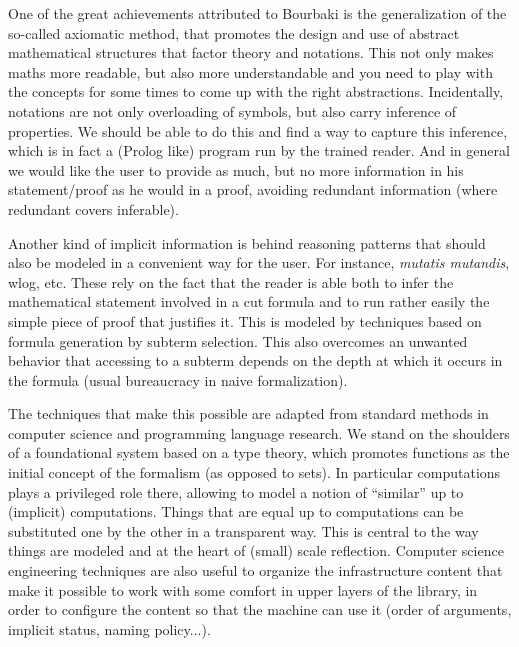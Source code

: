 One of the great achievements attributed to Bourbaki is the
generalization of the so-called axiomatic method, that promotes the
design and use of abstract mathematical structures that factor theory
and notations. This not only makes maths more readable, but also more
understandable and you need to play with the concepts for some times
to come up with the right abstractions. Incidentally, notations are
not only overloading of symbols, but also carry inference of
properties. We should be able to do this and find a way to capture this
inference, which is in fact a (Prolog like) program run by the trained
reader. And in general we would like the user to provide as much, but
no more information in his statement/proof as he would in a proof,
avoiding redundant information (where redundant covers inferable).

Another kind of implicit information is behind reasoning patterns that should also
be modeled in a convenient way for the user. For instance,
\emph{mutatis mutandis}, wlog, etc. These rely on the fact that the
reader is able both to infer the mathematical statement involved in a
cut formula 
 and to run rather easily the simple piece of proof that
justifies it. This is modeled by techniques based on formula generation
by subterm selection. This also overcomes an unwanted behavior that
accessing to a subterm depends on the depth at which it occurs in the
formula (usual bureaucracy in naive formalization).

The techniques that make this possible are adapted from standard
methods in computer science and programming language research. We stand on the
shoulders of a foundational system based on a type theory, which
promotes functions as the initial concept of the formalism (as opposed
to sets). In particular computations plays a privileged role there,
allowing to model a notion of ``similar'' up to (implicit)
computations. Things that are equal up to computations can be
substituted one by the other in a transparent way. This is central to
the way things are modeled and at the heart of (small) scale
reflection. Computer science engineering techniques are also useful
to organize the infrastructure content that make it possible to work with
some comfort in upper layers of the library, in order to configure
the content so that the machine can use it (order of arguments,
implicit status, naming policy...).






